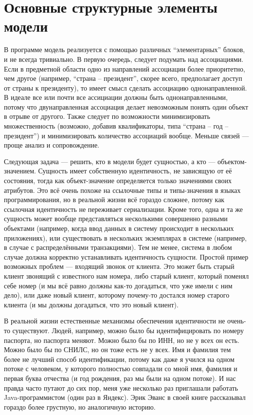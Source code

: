 \documentclass[a5paper]{article}
\begin{document}
\section{Основные структурные элементы модели}

В программе модель реализуется с помощью различных ``элементарных'' блоков, и не всегда тривиально. В первую очередь, следует подумать над ассоциациями. Если в предметной области одно из направлений ассоциации более приоритетно, чем другое (например, ``страна -- президент'', скорее всего, предполагает доступ от страны к президенту), то имеет смысл сделать ассоциацию однонаправленной. В идеале все или почти все ассициации должны быть однонаправленными, потому что двунаправленная ассоциация делает невозможным понять один объект в отрыве от другого. Также следует по возможности минимизировать множественность (возможно, добавив квалификаторы, типа ``страна -- год -- президент'') и минимизировать количество ассоциаций вообще. Меньше связей --- проще анализ и сопровождение.

Следующая задача --- решить, кто в модели будет сущностью, а кто --- объектом-значением. Сущность имеет собственную идентичность, не зависящую от её состояния, тогда как объект-значение определяется только значениями своих атрибутов. Это всё очень похоже на ссылочные типы и типы-значения в языках программирования, но в реальной жизни всё гораздо сложнее, потому как ссылочная идентичность не переживает сериализации. Кроме того, одна и та же сущность может вообще представляться несколькими совершенно разными объектами (например, когда ввод данных в систему происходит в нескольких приложениях), или существовать в нескольких экземплярах в системе (например, в случае с распределёнными транзакциями). Тем не менее, система в любом случае должна корректно устанавливать идентичность сущности. Простой пример возможных проблем --- входящий звонок от клиента. Это может быть старый клиент звонящий с известного нам номера, либо старый клиент, который поменял себе номер (и мы всё равно должны как-то догадаться, что уже имели с ним дело), или даже новый клиент, которому почему-то достался номер старого клиента (и мы должны догадаться, что это новый клиент).

В реальной жизни естественные механизмы обеспечения идентичности не очень-то существуют. Людей, например, можно было бы идентифицировать по номеру паспорта, но паспорта меняют. Можно было бы по ИНН, но не у всех он есть. Можно было бы по СНИЛС, но он тоже есть не у всех. Имя и фамилия тем более не лучший способ идентификации, потому как даже я учился на одном потоке с человеком, у которого полностью совпадали со мной имя, фамилия и первая буква отчества (и год рождения, раз мы были на одном потоке). И нас правда часто путают до сих пор, меня уже несколько раз приглашали работать Java-программистом (один раз в Яндекс). Эрик Эванс в своей книге рассказывал гораздо более грустную, но аналогичную историю.
\end{document}
